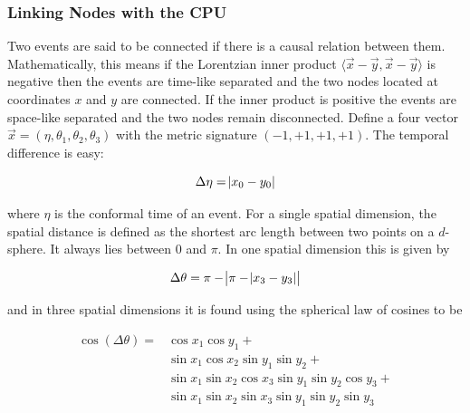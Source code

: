 \documentclass[preprint,notitlepage,amsmath,amssymb,floatfix]{revtex4-1}
\begin{document}
\subsubsection{Linking Nodes with the CPU}
Two events are said to be connected if there is a causal relation between them.  
Mathematically, this means if the Lorentzian inner product $\langle \vec x - \vec y, \vec x - \vec y\rangle$ is negative then the events are time-like separated and the two nodes located at coordinates $x$ and $y$ are connected.  
If the inner product is positive the events are space-like separated and the two nodes remain disconnected.
Define a four vector $\vec x = \left(\eta, \theta_1, \theta_2, \theta_3\right)$ with the metric signature $\left(-1,+1,+1,+1\right)$.
The temporal difference is easy:

\begin{equation}
\Delta\eta = \abs{x_0 - y_0}
\end{equation}

\noindent where $\eta$ is the conformal time of an event.  
For a single spatial dimension, the spatial distance is defined as the shortest arc length between two points on a $d$-sphere.  
It always lies between 0 and $\pi$.
In one spatial dimension this is given by

\begin{equation}
\Delta\theta = \pi - \abs{\pi - \abs{x_3 - y_3}}
\end{equation}

\noindent and in three spatial dimensions it is found using the spherical law of cosines to be

\begin{equation}
\begin{split}
\cos\left(\Delta\theta\right) = &\cos x_1\cos y_1 + \\
  &\sin x_1\cos x_2\sin y_1\sin y_2 + \\
  &\sin x_1\sin x_2\cos x_3\sin y_1\sin y_2\cos y_3 + \\
  &\sin x_1\sin x_2\sin x_3\sin y_1\sin y_2\sin y_3
\end{split}
\end{equation}
\end{document}
